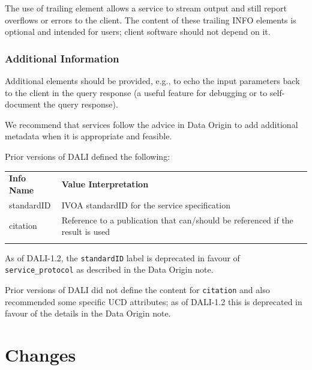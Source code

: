 \documentclass[11pt,letter]{ivoa}
\begin{document}
The use of trailing  element allows a service to stream output and still
report overflows or errors to the client. The content of these trailing INFO
elements is optional and intended for users; client software should not depend
on it.

\subsubsection{Additional Information}
Additional  elements should be provided, e.g., to echo the input parameters
back to the client in the query response (a useful feature for debugging or to
self-document the query response). 

We recommend that services follow the advice in Data Origin \citep{2026ivoa.spec.0331L}
to add additional metadata when it is appropriate and feasible.

Prior versions of DALI defined the following:

\begin{tabular}{l p{8cm}}
\sptablerule
\textbf{Info Name}&\textbf{Value Interpretation}\\
\sptablerule
standardID & IVOA standardID for the service specification \\
citation & Reference to a publication that can/should be referenced if the result is used \\
\sptablerule
\end{tabular}

As of DALI-1.2, the \verb|standardID| label is deprecated in favour of \verb|service_protocol|
as described in the Data Origin note.

Prior versions of DALI did not define the content for \verb|citation| and also recommended
some specific UCD attributes; as of DALI-1.2 this is deprecated in favour of the details in
the Data Origin note.

\appendix

\section{Changes}
\end{document}
